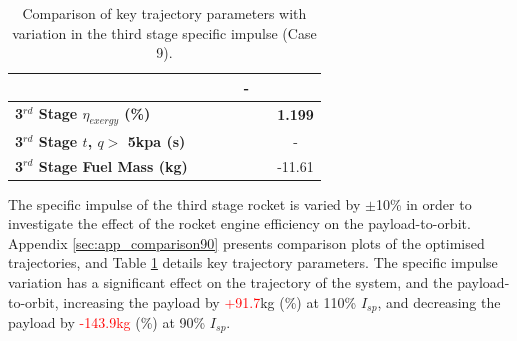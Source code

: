 \begin{table}[ht]
\begin{tabular}{l c c c c c c}
		& \SecondDistISPThreeStandardNoReturn
		& \SecondDistISPThreeOneHundredFiveNoReturn
		& \SecondDistISPThreeOneHundredTenNoReturn
		& -
		\\
		\hline 
		\textbf{3$^{rd}$ Stage $\eta_{exergy}$ (\%)}
		& \textbf{\thirddExergyEffISPThreeNinetyNoReturn}
		& \textbf{\thirddExergyEffISPThreeNinetyFiveNoReturn}
		& \textbf{\thirddExergyEffISPThreeStandardNoReturn}
		& \textbf{\thirddExergyEffISPThreeOneHundredFiveNoReturn}
		& \textbf{\thirddExergyEffISPThreeOneHundredTenNoReturn}
		& \textbf{1.199}
		\\
		\textbf{3$^{rd}$ Stage $t$, $q >$ 5kpa (s)}
		& \thirdqOverFiveISPThreeNinetyNoReturn
		& \thirdqOverFiveISPThreeNinetyFiveNoReturn
		& \thirdqOverFiveISPThreeStandardNoReturn
		& \thirdqOverFiveISPThreeOneHundredFiveNoReturn
		& \thirdqOverFiveISPThreeOneHundredTenNoReturn
		& -
		\\
		\textbf{3$^{rd}$ Stage Fuel Mass (kg)}
		& \thirdmFuelISPThreeNinetyNoReturn
		& \thirdmFuelISPThreeNinetyFiveNoReturn
		& \thirdmFuelISPThreeStandardNoReturn
		& \thirdmFuelISPThreeOneHundredFiveNoReturn
		& \thirdmFuelISPThreeOneHundredTenNoReturn
		&-11.61
		\\
		\hline 
	\end{tabular} 
	\caption{Comparison of key trajectory parameters with variation in the third stage specific impulse (Case 9).}
	\label{tab:comparison90}
\end{table}

The specific impulse of the third stage rocket is varied by $\pm$10\% in order to investigate the effect of the rocket engine efficiency on the payload-to-orbit. Appendix \ref{sec:app_comparison90} presents comparison plots of the optimised trajectories, and Table \ref{tab:comparison90} details key trajectory parameters. 
The specific impulse variation has a significant effect on the trajectory of the system, and the payload-to-orbit, increasing the payload by \textcolor{red}{+91.7}kg (\PayloadVarISPThreeOneHundredTenNoReturn\%) at 110\% $I_{sp}$, and decreasing the payload by \textcolor{red}{-143.9kg} (\PayloadVarISPThreeOneHundredTenNoReturn\%) at 90\% $I_{sp}$. 

